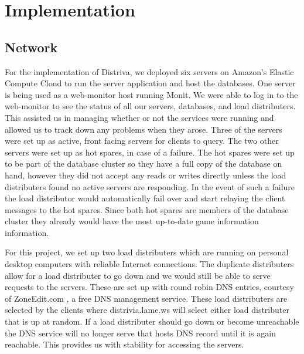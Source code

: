 \documentclass{dependencies/acm_proc_article-sp}
\begin{document}
\section{Implementation}
\subsection{Network}
For the implementation of Distriva, we deployed six servers on Amazon's Elastic Compute Cloud \cite{aec} to run the server application and host the databases.
One server is being used as a web-monitor host running Monit\cite{monit}.
We were able to log in to the web-monitor to see the status of all our servers, databases, and load distributers. 
This assisted us in managing whether or not the services were running and allowed us to track down any problems when they arose.
Three of the servers were set up as active, front facing servers for clients to query.
The two other servers were set up as hot spares, in case of a failure. 
The hot spares were set up to be part of the database cluster so they have a full copy of the database on hand, however they did not accept any reads or writes directly unless the load distributers found no active servers are responding. 
In the event of such a failure the load distributor would automatically fail over and start relaying the client messages to the hot spares. 
Since both hot spares are members of the database cluster they already would have the most up-to-date game information information.

For this project, we set up two load distributers which are running on personal desktop computers with reliable Internet connections.
The duplicate distributers allow for a load distributer to go down and we would still be able to serve requests to the servers.
These are set up with round robin DNS entries, courtesy of ZoneEdit.com \cite{zoneedit}, a free DNS management service.
These load distributers are selected by the clients where distrivia.lame.ws will select either load distributer that is up at random.
If a load distributer should go down or become unreachable the DNS service will no longer serve that hosts DNS record until it is again reachable.
This provides us with stability for accessing the servers.
\end{document}
